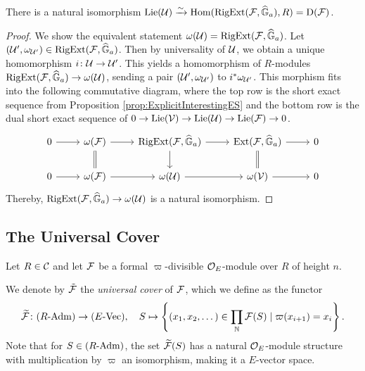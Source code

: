 \documentclass[../main.tex]{subfiles}
\begin{document}
\begin{lem}\label{lem:LieAlgOfUnivAddExt}
  There is a natural isomorphism $\operatorname{Lie}(\mathcal{U}) \xrightarrow{\sim} \operatorname{Hom}(\operatorname {RigExt}(\mathcal{F}, \widehat{\mathbb{G}}_a), R) 
  = \mathrm{D}(\mathcal{F})$.
\begin{proof}
  We show the equivalent statement $\omega(\mathcal{U}) = \operatorname {RigExt}(\mathcal{F}, \widehat{\mathbb{G}}_a)$. 
  Let $(\mathcal{U}', \omega_{\mathcal{U}'}) \in \operatorname {RigExt}(\mathcal{F}, \widehat{\mathbb{G}}_a)$. Then by universality of 
  $\mathcal{U}$, we obtain a unique homomorphism $i\colon  \mathcal{U} \to \mathcal{U}'$. This yields a 
  homomorphism of $R$-modules $\operatorname {RigExt}(\mathcal{F}, \widehat{\mathbb{G}}_a) \to \omega(\mathcal{U})$, 
  sending a pair $(\mathcal{U}', \omega_{\mathcal{U}'})$ to $i^*\omega_{\mathcal{U}'}$. This morphism
  fits into the following commutative diagram, where the top row is 
  the short exact sequence from Proposition \ref{prop:ExplicitInterestingES}
  and the bottom row is the dual short exact sequence of 
  $0 \to \operatorname{Lie}(\mathcal{V}) \to \operatorname{Lie}(\mathcal{U}) \to \operatorname{Lie}(\mathcal{F}) \to 0$.
  \begin{equation*}
  \begin{tikzcd}[ampersand replacement=\&]
  	0 \& {\omega(\cF)} \& {\RigExt(\cF, \Ghat_a)} \& {\Ext(\cF, \Ghat_a)} \& 0 \\
  	0 \& {\omega(\cF)} \& {\omega(\cU)} \& {\omega(\cV)} \& 0
  	\arrow[from=1-1, to=1-2]
  	\arrow[from=1-2, to=1-3]
  	\arrow[Rightarrow, no head, from=1-2, to=2-2]
  	\arrow[from=1-3, to=1-4]
  	\arrow[from=1-3, to=2-3]
  	\arrow[from=1-4, to=1-5]
  	\arrow[Rightarrow, no head, from=1-4, to=2-4]
  	\arrow[from=2-1, to=2-2]
  	\arrow[from=2-2, to=2-3]
  	\arrow[from=2-3, to=2-4]
  	\arrow[from=2-4, to=2-5]
  \end{tikzcd}
  \end{equation*}
  Thereby, $\operatorname {RigExt}(\mathcal{F}, \widehat{\mathbb{G}}_a) \to \omega(\mathcal{U})$ is a natural isomorphism.
\end{proof}
\end{lem}

\subsection{The Universal Cover} %
\label{sub:Tate Modules and the Universal Cover} 

Let $R \in \mathcal{C}$ and let $\mathcal{F}$ be a formal
$\varpi$-divisible ${\mathcal{O}_E}$-module over $R$ of height $n$. 
\begin{defi}
  We denote by $\tilde {\mathcal{F}}$ the \emph{universal cover} 
  of $\mathcal{F}$, which we define as the functor
  \begin{equation*}
    \widetilde{\mathcal{F}} \colon {({R}\textnormal-\allowbreak\mathrm{Adm})} \to {({E}\textnormal-\allowbreak\mathrm{Vec})}, \quad
    S \mapsto \left\{(x_1, x_2, \dots) \in \prod_{\mathbb{N}} \mathcal{F}(S) \mid \varpi (x_{i+1}) =
    x_i \right\}.
  \end{equation*}
  Note that for $S \in {({R}\textnormal-\allowbreak\mathrm{Adm})}$, the set $\widetilde{\mathcal{F}}(S)$ has a natural
  ${\mathcal{O}_E}$-module structure with multiplication by $\varpi$ an isomorphism, making
  it a $E$-vector space.
\end{defi}
\end{document}
